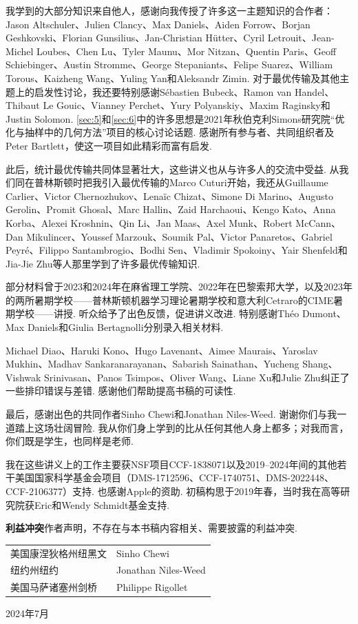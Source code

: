 我学到的大部分知识来自他人，感谢向我传授了许多这一主题知识的合作者：Jason Altschuler、Julien Clancy、Max Daniels、Aiden Forrow、Borjan Geshkovski、Florian Gunsilius、Jan-Christian Hütter、Cyril Letrouit、Jean-Michel Loubes、Chen Lu、Tyler Maunu、Mor Nitzan、Quentin Paris、Geoff Schiebinger、Austin Stromme、George Stepaniants、Felipe Suarez、William Torous、Kaizheng Wang、Yuling Yan和Aleksandr Zimin. 对于最优传输及其他主题上的启发性讨论，我还要特别感谢Sébastien Bubeck、Ramon van Handel、Thibaut Le Gouic、Vianney Perchet、Yury Polyanskiy、Maxim Raginsky和Justin Solomon. \autoref{sec:5}和\autoref{sec:6}中的许多思想是2021年秋伯克利Simons研究院“优化与抽样中的几何方法”项目的核心讨论话题. 感谢所有参与者、共同组织者及Peter Bartlett，使这一项目如此精彩而富有启发.

此后，统计最优传输共同体显著壮大，这些讲义也从与许多人的交流中受益. 从我们同在普林斯顿时把我引入最优传输的Marco Cuturi开始，我还从Guillaume Carlier、Victor Chernozhukov、Lenaïc Chizat、Simone Di Marino、Augusto Gerolin、Promit Ghosal、Marc Hallin、Zaid Harchaoui、Kengo Kato、Anna Korba、Alexei Kroshnin、Qin Li、Jan Maas、Axel Munk、Robert McCann、Dan Mikulincer、Youssef Marzouk、Soumik Pal、Victor Panaretos、Gabriel Peyré、Filippo Santambrogio、Bodhi Sen、Vladimir Spokoiny、Yair Shenfeld和Jia-Jie Zhu等人那里学到了许多最优传输知识.

部分材料曾于2023和2024年在麻省理工学院、2022年在巴黎索邦大学，以及2023年的两所暑期学校——普林斯顿机器学习理论暑期学校和意大利Cetraro的CIME暑期学校——讲授. 听众给予了出色反馈，促进讲义改进. 特别感谢Théo Dumont、Max Daniels和Giulia Bertagnolli分别录入相关材料.

Michael Diao、Haruki Kono、Hugo Lavenant、Aimee Maurais、Yaroslav Mukhin、Madhav Sankaranarayanan、Sabarish Sainathan、Yucheng Shang、Vishwak Srinivasan、Panos Tsimpos、Oliver Wang、Liane Xu和Julie Zhu纠正了一些排印错误与差错. 感谢他们帮助提高书稿的可读性.

最后，感谢出色的共同作者Sinho Chewi和Jonathan Niles-Weed. 谢谢你们与我一道踏上这场壮阔冒险. 我从你们身上学到的比从任何其他人身上都多；对我而言，你们既是学生，也同样是老师.

我在这些讲义上的工作主要获NSF项目CCF-1838071以及2019--2024年间的其他若干美国国家科学基金会项目（DMS-1712596、CCF-1740751、DMS-2022448、CCF-2106377）支持. 也感谢Apple的资助. 初稿构思于2019年春，当时我在高等研究院获Eric和Wendy Schmidt基金支持.

\noindent\textbf{利益冲突}\quad 作者声明，不存在与本书稿内容相关、需要披露的利益冲突.

\vspace{0.5cm}
\noindent\begin{tabular}{ll}
美国康涅狄格州纽黑文 & Sinho Chewi\\
纽约州纽约 & Jonathan Niles-Weed\\
美国马萨诸塞州剑桥 & Philippe Rigollet
\end{tabular}\par
\noindent 2024年7月
